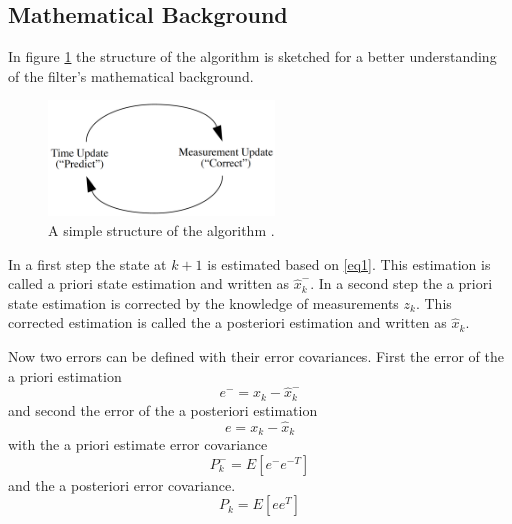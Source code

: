\subsection*{Mathematical Background}\label{math_kalman}
In figure \ref{simple_schematic} the structure of the algorithm is sketched for a better understanding of the filter's mathematical background. 
\begin{figure}[h]
\begin{center}
\includegraphics[width=6cm]{pictures/simple_schematic_algo.png}
\caption{A simple structure of the algorithm \cite{welch1997}.}
\label{simple_schematic}
\end{center}
\end{figure}
In a first step the state at $k+1$ is estimated based on \ref{eq1}. This estimation is called a priori state estimation and written as $\hat{x}_k^{-}$. In a second step the a priori state estimation is corrected by the knowledge of measurements $z_k$. This corrected estimation is called the a posteriori estimation and written as $\hat{x}_k$.

Now two errors can be defined with their error covariances. First the error of the a priori estimation 
\begin{equation}
e^{-}=x_k-\hat{x}_k^{-}
\end{equation}
and second the error of the a posteriori estimation 
\begin{equation}
e=x_k-\hat{x}_k
\end{equation}
with the a priori estimate error covariance 
\begin{equation}
P^{-}_k=E[e^{-}e^{-T}]
\end{equation}
and the a posteriori error covariance.
\begin{equation}
P_k=E[ee^{T}]\label{P_post}
\end{equation}

